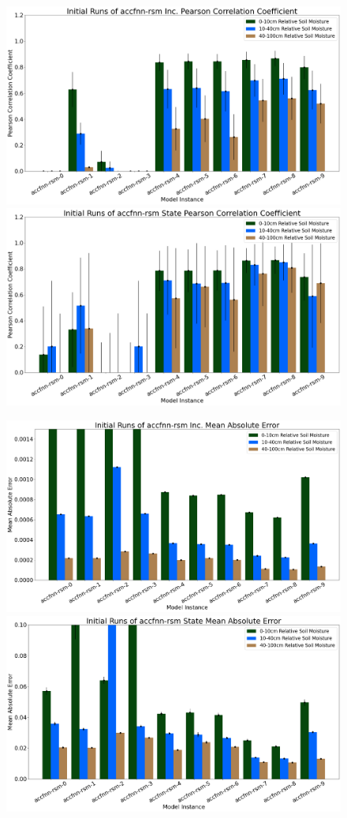\begin{figure}[hp!]
    \centering
    \includegraphics[width=.48\linewidth,draft=false]{figures/efficiency_initial-best/eval_test_efficiency_initial-accfnn-rsm_cc_res.png}
    \includegraphics[width=.48\linewidth,draft=false]{figures/efficiency_initial-best/eval_test_efficiency_initial-accfnn-rsm_cc_state.png}

    \includegraphics[width=.48\linewidth,draft=false]{figures/efficiency_initial-best/eval_test_efficiency_initial-accfnn-rsm_mae_res.png}
    \includegraphics[width=.48\linewidth,draft=false]{figures/efficiency_initial-best/eval_test_efficiency_initial-accfnn-rsm_mae_state.png}


\end{figure}
